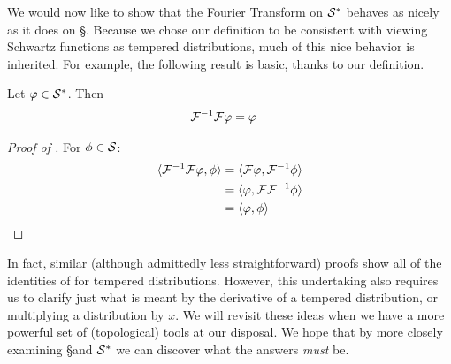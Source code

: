       We would now like to show that the Fourier Transform on $\S^*$ behaves as nicely as it does on \S.
      Because we chose our definition to be consistent with viewing Schwartz functions as tempered distributions, much of this nice behavior is inherited.
      For example, the following result is basic, thanks to our definition.
      \begin{thm}
        \label{thm:fourinv_td}
        Let $\varphi\in\S^*$.
        Then
        \begin{align*}
          \F^{-1}\F\varphi &= \varphi
        \end{align*}
      \end{thm}
      \begin{proof}[Proof of ]
        For $\phi\in\S$:
        \begin{align*}
          \langle\F^{-1}\F\varphi, \phi\rangle &= \langle \F\varphi, \F^{-1}\phi\rangle\\
          &= \langle\varphi, \F\F^{-1}\phi\rangle\\
          &= \langle\varphi, \phi\rangle
        \end{align*}
      \end{proof}

      In fact, similar (although admittedly less straightforward) proofs show all of the identities of  for tempered distributions.
      However, this undertaking also requires us to clarify just what is meant by the derivative of a tempered distribution, or multiplying a distribution by $x$.
      We will revisit these ideas when we have a more powerful set of (topological) tools at our disposal.
      We hope that by more closely examining \S and $\S^*$ we can discover what the answers \emph{must} be.


